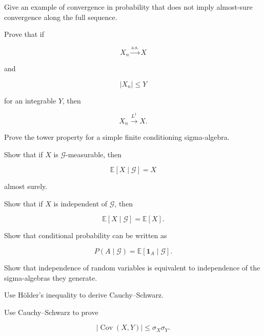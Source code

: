 \begin{exercise}[3]
Give an example of convergence in probability that does not imply
almost-sure convergence along the full sequence.
\end{exercise}

\begin{exercise}[3]
Prove that if

\[
X_n\xrightarrow{\text{a.s.}}X
\]

and

\[
|X_n|\leq Y
\]

for an integrable \(Y\), then

\[
X_n\xrightarrow{L^1}X.
\]
\end{exercise}

\begin{exercise}[3]
Prove the tower property for a simple finite conditioning sigma-algebra.
\end{exercise}

\begin{exercise}[3]
Show that if \(X\) is \(\mathcal{G}\)-measurable, then

\[
\mathbb{E}[X\mid\mathcal{G}]
=
X
\]

almost surely.
\end{exercise}

\begin{exercise}[3]
Show that if \(X\) is independent of \(\mathcal{G}\), then

\[
\mathbb{E}[X\mid\mathcal{G}]
=
\mathbb{E}[X].
\]
\end{exercise}

\begin{exercise}[3]
Show that conditional probability can be written as

\[
P(A\mid\mathcal{G})
=
\mathbb{E}
[
\mathbf{1}_A
\mid
\mathcal{G}
].
\]
\end{exercise}

\begin{exercise}[3]
Show that independence of random variables is equivalent to independence
of the sigma-algebras they generate.
\end{exercise}

\begin{exercise}[3]
Use Hölder's inequality to derive Cauchy--Schwarz.
\end{exercise}

\begin{exercise}[3]
Use Cauchy--Schwarz to prove

\[
|\operatorname{Cov}(X,Y)|
\leq
\sigma_X\sigma_Y.
\]
\end{exercise}

